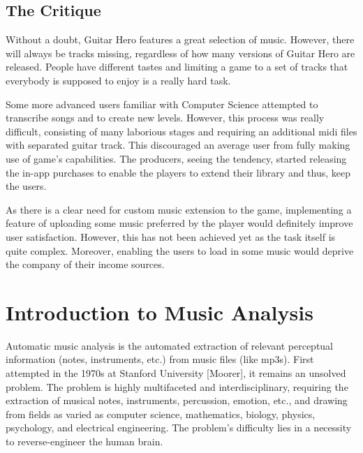 \vspace{10pt}


\subsection{The Critique}

Without a doubt, Guitar Hero features a great selection of music. However, there will always be tracks missing, regardless of how many versions of Guitar Hero are released. People have different tastes and limiting a game to a set of tracks that everybody is supposed to enjoy is a really hard task. 

Some more advanced users familiar with Computer Science attempted to transcribe songs and to create new levels. However, this process was really difficult, consisting of many laborious stages and requiring an additional midi files with separated guitar track. This discouraged an average user from fully making use of game’s capabilities. The producers, seeing the tendency, started releasing the in-app purchases to enable the players to extend their library and thus, keep the users. 

As there is a clear need for custom music extension to the game, implementing a feature of uploading some music preferred by the player would definitely improve user satisfaction. However, this has not been achieved yet as the task itself is quite complex. Moreover, enabling the users to load in some music would deprive the company of their income sources.

\vspace{30pt}

\section{Introduction to Music Analysis}

Automatic music analysis is the automated extraction of relevant perceptual information (notes, instruments, etc.) from music files (like mp3s). First attempted in the 1970s at Stanford University [Moorer], it remains an unsolved problem. The problem is highly multifaceted and interdisciplinary, requiring the extraction of musical notes, instruments, percussion, emotion, etc., and drawing from fields as varied as computer science, mathematics, biology, physics, psychology, and electrical engineering. The problem's difficulty lies in a necessity to reverse-engineer the human brain. 

